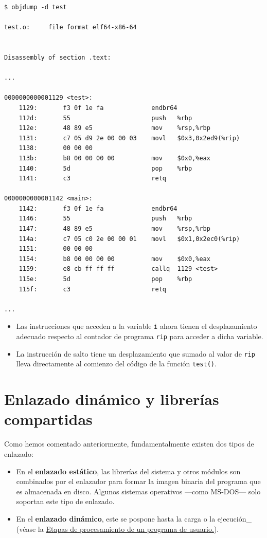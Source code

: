 \begin{verbatim}
$ objdump -d test

test.o:     file format elf64-x86-64


Disassembly of section .text:

...

0000000000001129 <test>:                                           
    1129:       f3 0f 1e fa             endbr64
    112d:       55                      push   %rbp
    112e:       48 89 e5                mov    %rsp,%rbp
    1131:       c7 05 d9 2e 00 00 03    movl   $0x3,0x2ed9(%rip)   
    1138:       00 00 00
    113b:       b8 00 00 00 00          mov    $0x0,%eax
    1140:       5d                      pop    %rbp
    1141:       c3                      retq

0000000000001142 <main>:
    1142:       f3 0f 1e fa             endbr64
    1146:       55                      push   %rbp
    1147:       48 89 e5                mov    %rsp,%rbp
    114a:       c7 05 c0 2e 00 00 01    movl   $0x1,0x2ec0(%rip)   
    1151:       00 00 00
    1154:       b8 00 00 00 00          mov    $0x0,%eax
    1159:       e8 cb ff ff ff          callq  1129 <test>         
    115e:       5d                      pop    %rbp
    115f:       c3                      retq

...
\end{verbatim}

\begin{itemize}
\item
  Las instrucciones que acceden a la variable \texttt{i} ahora tienen el
  desplazamiento adecuado respecto al contador de programa \texttt{rip}
  para acceder a dicha variable.
\item
  La instrucción de salto tiene un desplazamiento que sumado al valor de
  \texttt{rip} lleva directamente al comienzo del código de la función
  \texttt{test()}.
\end{itemize}

\section{Enlazado dinámico y librerías
compartidas}\label{_enlazado_dinuxe1mico_y_libreruxedas_compartidas}

Como hemos comentado anteriormente, fundamentalmente existen dos tipos
de enlazado:

\begin{itemize}
\item
  En el \textbf{enlazado estático}{}, las librerías del sistema y otros
  módulos son combinados por el enlazador para formar la imagen binaria
  del programa que es almacenada en disco. Algunos sistemas operativos
  ---como MS-DOS--- solo soportan este tipo de enlazado.
\item
  En el \textbf{enlazado dinámico}{}, este se pospone hasta la carga o
  la ejecución\_ (véase la
  \hyperref[fig-etapas-programas-de-usuario]{Etapas de procesamiento de
  un programa de usuario.}).
\end{itemize}

